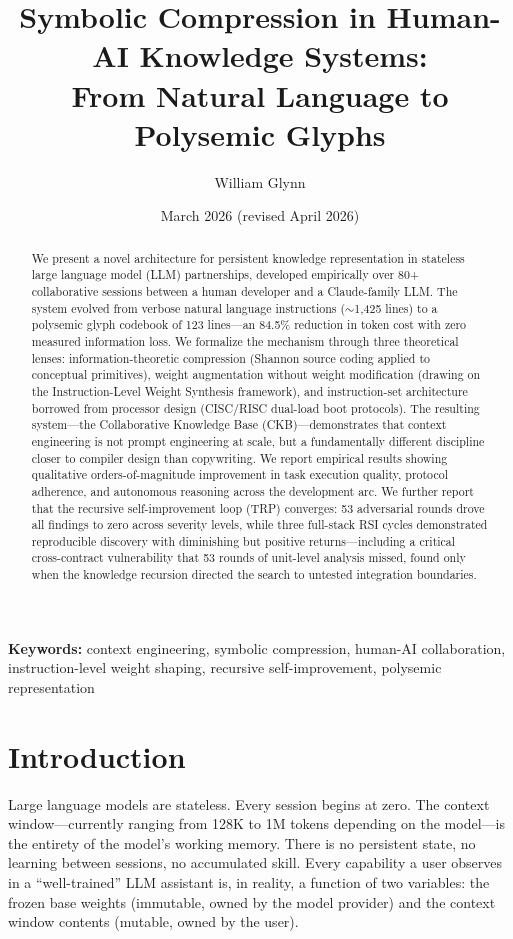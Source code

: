 \documentclass[11pt, a4paper]{article}
\title{\textbf{Symbolic Compression in Human-AI Knowledge Systems:\\From Natural Language to Polysemic Glyphs}}
\author[1]{William Glynn}
\affil[1]{VibeSwap --- Independent Research}
\date{March 2026 (revised April 2026)}
\begin{document}
\maketitle

\begin{abstract}
We present a novel architecture for persistent knowledge representation in stateless large language model (LLM) partnerships, developed empirically over 80+ collaborative sessions between a human developer and a Claude-family LLM. The system evolved from verbose natural language instructions ($\sim$1,425 lines) to a polysemic glyph codebook of 123 lines---an 84.5\% reduction in token cost with zero measured information loss. We formalize the mechanism through three theoretical lenses: information-theoretic compression (Shannon source coding applied to conceptual primitives), weight augmentation without weight modification (drawing on the Instruction-Level Weight Synthesis framework), and instruction-set architecture borrowed from processor design (CISC/RISC dual-load boot protocols). The resulting system---the Collaborative Knowledge Base (CKB)---demonstrates that context engineering is not prompt engineering at scale, but a fundamentally different discipline closer to compiler design than copywriting. We report empirical results showing qualitative orders-of-magnitude improvement in task execution quality, protocol adherence, and autonomous reasoning across the development arc. We further report that the recursive self-improvement loop (TRP) converges: 53 adversarial rounds drove all findings to zero across severity levels, while three full-stack RSI cycles demonstrated reproducible discovery with diminishing but positive returns---including a critical cross-contract vulnerability that 53 rounds of unit-level analysis missed, found only when the knowledge recursion directed the search to untested integration boundaries.
\end{abstract}

\noindent\textbf{Keywords:} context engineering, symbolic compression, human-AI collaboration, instruction-level weight shaping, recursive self-improvement, polysemic representation

\section{Introduction}
\label{sec:introduction}

Large language models are stateless. Every session begins at zero. The context window---currently ranging from 128K to 1M tokens depending on the model---is the entirety of the model's working memory. There is no persistent state, no learning between sessions, no accumulated skill. Every capability a user observes in a ``well-trained'' LLM assistant is, in reality, a function of two variables: the frozen base weights (immutable, owned by the model provider) and the context window contents (mutable, owned by the user).
\end{document}
